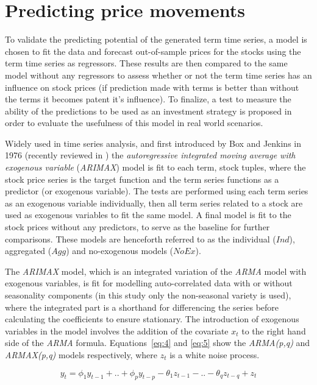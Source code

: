 \documentclass[conference,11pt]{IEEEtran}
\begin{document}
\section{Predicting price movements}
To validate the predicting potential of the generated term time series, a model is chosen to fit the data and forecast out-of-sample prices for the stocks using the term time series as regressors. These results are then compared to the same model without any regressors to assess whether or not the term time series has an influence on stock prices (if prediction made with terms is better than without the terms it becomes patent it's influence). To finalize, a test to measure the ability of the predictions to be used as an investment strategy is proposed in order to evaluate the usefulness of this model in real world scenarios.

\par
Widely used in time series analysis, and first introduced by Box and Jenkins in 1976 (recently reviewed in \citep{box2008time}) the \textit{autoregressive integrated moving average with exogenous variable} (\textit{ARIMAX}) model is fit to each term, stock tuples, where the stock price series is the target function and the term series functions as a predictor (or exogenous variable). The tests are performed using each term series as an exogenous variable individually, then all term series related to a stock are used as exogenous variables to fit the same model. A final model is fit to the stock prices without any predictors, to serve as the baseline for further comparisons. These models are henceforth referred to as the individual (\(Ind\)), aggregated (\(Agg\)) and no-exogenous models (\(NoEx\)).

\par
The \textit{ARIMAX} model, which is an integrated variation of the \textit{ARMA} model with exogenous variables, is fit for modelling auto-correlated data with or without seasonality components (in this study only the non-seasonal variety is used), where the integrated part is a  shorthand for differencing the series before calculating the coefficients to ensure stationary. The introduction of exogenous variables in the model involves the addition of the covariate \(x_t\) to the right hand side of the \textit{ARMA} formula. Equations~\ref{eq:4} and \ref{eq:5} show the \textit{ARMA(p,q)} and \textit{ARMAX(p,q)} models respectively, where \(z_t\) is a white noise process.

\begin{equation}
\label{eq:4}
y_t=\phi_1 y_{t-1} + .. + \phi_p y_{t-p} - 
\theta_1 z_{t-1} - .. - \theta_q z_{t-q} +
z_t
\end{equation}
\end{document}
